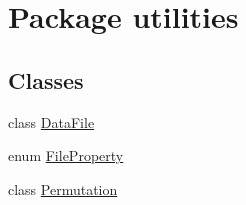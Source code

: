 \hypertarget{namespaceutilities}{}\section{Package utilities}
\label{namespaceutilities}
\subsection*{Classes}
\begin{DoxyCompactItemize}
\item 
class \hyperlink{classutilities_1_1_data_file}{Data\+File}
\item 
enum \hyperlink{enumutilities_1_1_file_property}{File\+Property}
\item 
class \hyperlink{classutilities_1_1_permutation}{Permutation}
\end{DoxyCompactItemize}

